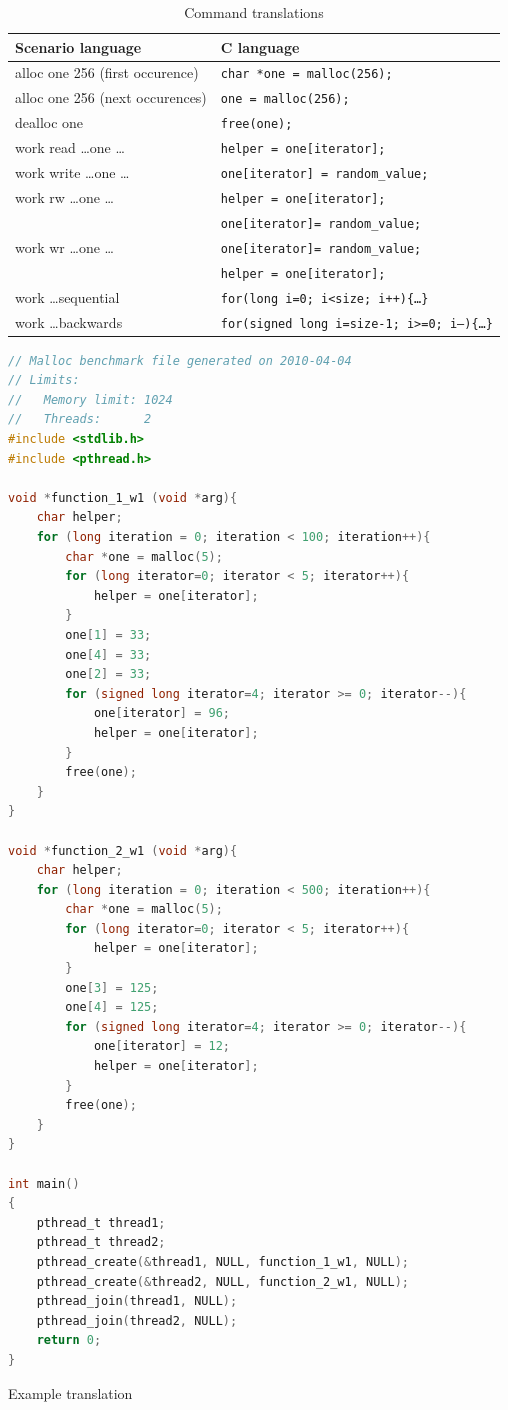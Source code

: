 \begin{table}
\begin{center}
\begin{tabular}{|l|l|}
\hline
Scenario language & C language \\ \hline \hline
alloc one 256 (first occurence) & {\tt char *one = malloc(256);} \\ \hline
alloc one 256 (next occurences) & {\tt one = malloc(256);} \\ \hline
dealloc one & {\tt free(one);} \\ \hline
work read \ldots one \ldots & {\tt helper = one[iterator];} \\ \hline
work write \ldots one \ldots & {\tt one[iterator] = random\_value;} \\ \hline
work rw \ldots one \ldots & {\tt helper = one[iterator];} \\
& {\tt one[iterator]= random\_value;} \\ \hline
work wr \ldots one \ldots & {\tt one[iterator]= random\_value;} \\
& {\tt helper = one[iterator];} \\ \hline
work \ldots sequential & {\tt for(long i=0; i<size; i++)\{\ldots\}} \\ \hline
work \ldots backwards & {\tt for(signed long i=size-1; i>=0; i--)\{\ldots\}} \\
\hline
\end{tabular}
\caption{Command translations}
\label{scen-translate-table}
\end{center}
\end{table}
\begin{table}
\begin{center}
\begin{lstlisting}[frame=single, basicstyle=\tt\footnotesize, language=C]
// Malloc benchmark file generated on 2010-04-04
// Limits:
//   Memory limit: 1024
//   Threads:      2
#include <stdlib.h>
#include <pthread.h>

void *function_1_w1 (void *arg){
	char helper;
	for (long iteration = 0; iteration < 100; iteration++){
		char *one = malloc(5);
		for (long iterator=0; iterator < 5; iterator++){
			helper = one[iterator];
		}
		one[1] = 33;
		one[4] = 33;
		one[2] = 33;
		for (signed long iterator=4; iterator >= 0; iterator--){
			one[iterator] = 96;
			helper = one[iterator];
		}
		free(one);
	}
}

void *function_2_w1 (void *arg){
	char helper;
	for (long iteration = 0; iteration < 500; iteration++){
		char *one = malloc(5);
		for (long iterator=0; iterator < 5; iterator++){
			helper = one[iterator];
		}
		one[3] = 125;
		one[4] = 125;
		for (signed long iterator=4; iterator >= 0; iterator--){
			one[iterator] = 12;
			helper = one[iterator];
		}
		free(one);
	}
}

int main()
{
	pthread_t thread1;
	pthread_t thread2;
	pthread_create(&thread1, NULL, function_1_w1, NULL);
	pthread_create(&thread2, NULL, function_2_w1, NULL);
	pthread_join(thread1, NULL);
	pthread_join(thread2, NULL);
	return 0;
}
\end{lstlisting}
\caption{Example translation}
\label{scenario-sample-trans}
\end{center} 
\end{table}


